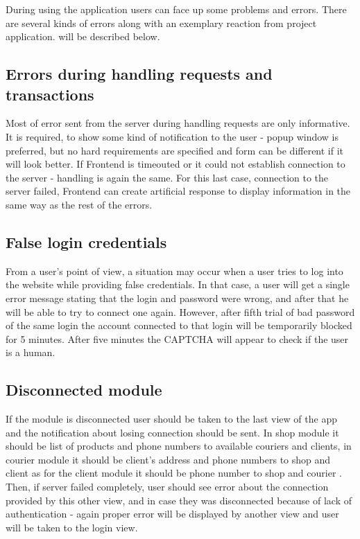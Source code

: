 \documentclass[../main.tex]{subfiles}
\begin{document}
During using the application users can face up some problems and errors. There are several kinds of errors along with an exemplary reaction from project application. will be described below.

\subsection{Errors during handling requests and transactions}

Most of error sent from the server during handling requests are only informative. It is required, to show some kind of notification to the user - popup window is preferred, but no hard requirements are specified and form can be different if it will look better. If Frontend is timeouted or it could not establish connection to the server - handling is again the same. For this last case, connection to the server failed, Frontend can create artificial response to display information in the same way as the rest of the errors.

\subsection{False login credentials}

From a user’s point of view, a situation may occur when a user tries to log into the website while providing false credentials. In that case, a user will get a single error message stating that the login and password were wrong, and after that he will be able to try to connect one again. However, after fifth trial of bad password of the same login the account connected to that login will be temporarily blocked for 5 minutes. After five minutes the CAPTCHA will appear to check if the user is a human.

\subsection{Disconnected module}

If the module is disconnected user should be taken to the last
view of the app and the notification about losing connection should be sent. In shop module it should be list of products and phone numbers to available couriers and clients, in courier module it should be client's address and phone numbers to shop and client as for the client module it should be phone number to shop and courier . Then, if server failed completely, user should see error about the connection provided by this other view, and in case they was disconnected because of lack of authentication - again proper error will be displayed by another view and user will be taken to the login view.
\end{document}
